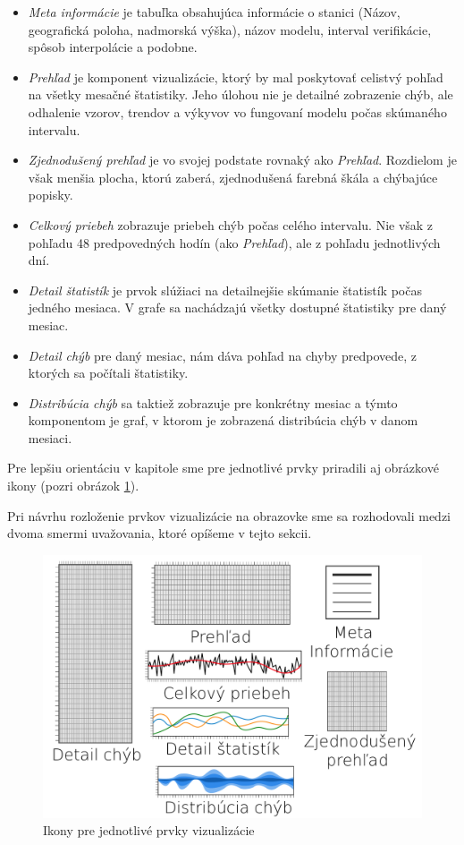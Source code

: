 \begin{itemize}
	\item\textit{Meta informácie} je tabuľka obsahujúca informácie o stanici (Názov, geografická poloha, nadmorská výška), názov modelu, interval verifikácie, spôsob interpolácie a podobne.  
		
	\item\textit{Prehľad} je komponent vizualizácie, ktorý by mal poskytovať celistvý pohľad na všetky mesačné štatistiky. Jeho úlohou nie je detailné zobrazenie chýb, ale odhalenie vzorov, trendov a výkyvov vo fungovaní modelu počas skúmaného intervalu.
	
	\item\textit{Zjednodušený prehľad} je vo svojej podstate rovnaký ako \textit{Prehľad}. Rozdielom je však menšia plocha, ktorú zaberá, zjednodušená farebná škála a chýbajúce popisky.
	
	\item\textit{Celkový priebeh} zobrazuje priebeh chýb počas celého intervalu. Nie však z pohľadu 48 predpovedných hodín (ako \textit{Prehľad}), ale z pohľadu jednotlivých dní.
	
	\item\textit{Detail štatistík} je prvok slúžiaci na detailnejšie skúmanie štatistík počas jedného mesiaca. V grafe sa nachádzajú všetky dostupné štatistiky pre daný mesiac.
	
	\item\textit{Detail chýb} pre daný mesiac, nám dáva pohľad na chyby predpovede, z ktorých sa počítali štatistiky.
	
	\item\textit{Distribúcia chýb} sa taktiež zobrazuje pre konkrétny mesiac a týmto komponentom je graf, v ktorom je zobrazená distribúcia chýb v danom mesiaci.
\end{itemize}

\noindent Pre lepšiu orientáciu v kapitole sme pre jednotlivé prvky priradili aj obrázkové ikony (pozri obrázok \ref{fig:designicons}). 
 
Pri návrhu rozloženie prvkov vizualizácie na obrazovke sme sa rozhodovali medzi dvoma smermi uvažovania, ktoré opíšeme v tejto sekcii. 

\begin{figure}
	\centering
	\includegraphics[width = 4.5in]{designicons}
	\caption{Ikony pre jednotlivé prvky vizualizácie}
	\label{fig:designicons}
\end{figure}


